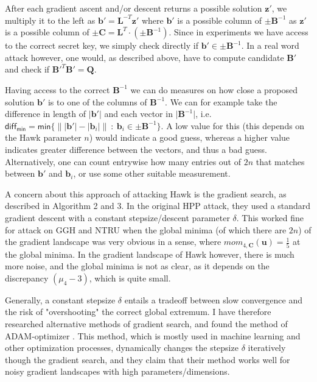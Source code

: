 \documentclass[12 pt]{article}        	%
\newcommand{\mat}[1]{\mathbf{#1}}
\renewcommand{\vec}[1]{\mathbf{#1}}
\begin{document}
After each gradient ascent and/or descent returns a possible solution $\vec{z}'$, 
we multiply it to the left as $\vec{b}' = \mat{L}^{-T} \vec{z}'$ where $\vec{b}'$ is a possible column of $\pm \mat{B}^{-1}$ as $\vec{z}'$ is a possible column of $\pm \mat{C} = \mat{L}^T \cdot (\pm \mat{B}^{-1})$.
Since in experiments we have access to the correct secret key, we simply check directly if $\mat{b}' \in \pm \mat{B}^{-1}$.
In a real word attack however, one would, as described above, have to compute candidate $\mat{B}'$ and check if $\mat{B}'^T\mat{B}' = \mat{Q}$.

Having access to the correct $\mat{B}^{-1}$ we can do measures on how close a proposed solution $\vec{b}'$ is to one of the columns of $\mat{B}^{-1}$.
We can for example take the difference in length of $\lvert \vec{b}' \rvert $ and each vector in $\lvert \mat{B}^{-1}\rvert$, i.e. 
$ \mathsf{diff_{min}} = \mathsf{min} \{\lVert \lvert \vec{b}' \rvert - \lvert \vec{b}_i \rvert \rVert \ \mathbf{:} \ \vec{b}_i \in \pm \mat{B}^{-1}\}$.
A low value for this (this depends on the Hawk parameter $n$) would indicate a good guess, whereas a higher value indicates greater difference between the vectors, and thus a bad guess.
Alternatively, one can count entrywise how many entries out of $2n$ that matches between $\vec{b}'$ and $\vec{b}_i$, or use some other suitable measurement.

A concern about this approach of attacking Hawk is the gradient search, as described in Algorithm 2 and 3. In the original HPP attack, they used a standard gradient descent with a constant stepsize/descent parameter $\delta$. This
worked fine for attack on GGH and NTRU when the global minima (of which there are $2n$) of the gradient landscape was very obvious in a sense, where $mom_{4, \mat{C}}(\vec{u}) = \frac{1}{5}$ at the global minima. 
In the gradient landscape of Hawk however, there is much more noise, and the global minima is
not as clear, as it depends on the discrepancy $(\mu_4 - 3)$, which is quite small. 

Generally, a constant stepsize $\delta$ entails a tradeoff between slow convergence and the risk of "overshooting" the correct global extremum.  
I have therefore researched alternative methods of gradient search, and found the method of ADAM-optimizer \cite{KB17}. This method, which is mostly used in machine learning and other optimization processes, dynamically changes the 
stepsize $\delta$ iteratively though the gradient search, and they claim that their method works well for noisy gradient landscapes with high parameters/dimensions.
\end{document}
